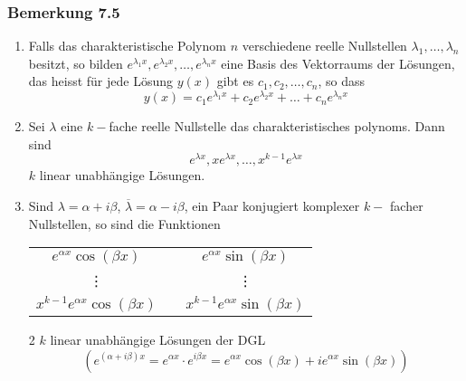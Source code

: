 \subsubsection*{Bemerkung 7.5}
\begin{enumerate}
\item Falls das charakteristische Polynom $n$ verschiedene reelle Nullstellen $\lambda_1,\dots,\lambda_n$ besitzt, so bilden ${e^{{\lambda _1}x}},{e^{{\lambda _2}x}}, \ldots ,{e^{{\lambda _n}x}}$ eine Basis des Vektorraums der Lösungen, das heisst für jede Lösung $y(x)$ gibt es $c_1,c_2,\dots,c_n$, so dass \[y(x)={c_1}{e^{{\lambda _1}x}} + {c_2}{e^{{\lambda _2}x}} +  \ldots  + {c_n}{e^{{\lambda _n}x}}\]

\item Sei $\lambda$ eine $k-$fache reelle Nullstelle das charakteristisches polynoms. Dann sind \[e^{\lambda x},xe^{\lambda x},\dots ,x^{k-1}e^{\lambda x}\] $k$ linear unabhängige Lösungen.
\item Sind $\lambda=\alpha+i\beta$, $\overline{\lambda}=\alpha-i\beta$, ein Paar konjugiert komplexer $k-$ facher Nullstellen, so sind die Funktionen\\\begin{center}
\begin{tabular}{c c c}
$e^{\alpha x}\cos\left(\beta x\right)$&\hspace{10mm}&$e^{\alpha x}\sin\left(\beta x\right)$\\
\vdots&\hspace{10mm} & \vdots\\
$x^{k-1}e^{\alpha x}\cos\left(\beta x\right)$&\hspace{10mm}&$x^{k-1}e^{\alpha x}\sin\left(\beta x\right)$\\
\end{tabular}
\end{center}
2 $k$ linear unabhängige Lösungen der DGL \[\left( {{e^{\left( {\alpha  + i\beta } \right)x}} = {e^{\alpha x}} \cdot {e^{i\beta x}} = {e^{\alpha x}}\cos \left( {\beta x} \right) + i{e^{\alpha x}}\sin \left( {\beta x} \right)} \right)\]
\end{enumerate}

